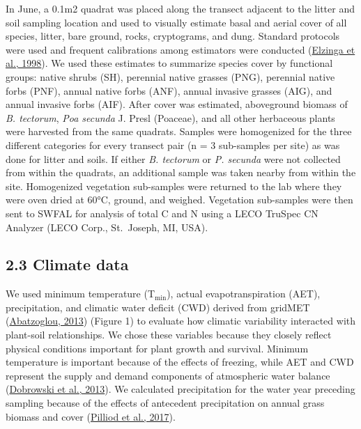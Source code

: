 \documentclass[
  11pt,
  a4paper,
]{article}
\begin{document}
In June, a 0.1m2 quadrat was placed along the transect adjacent to the litter and soil sampling location and used to visually estimate basal and aerial cover of all species, litter, bare ground, rocks, cryptograms, and dung. Standard protocols were used and frequent calibrations among estimators were conducted (\protect\hyperlink{ref-Elzinga1998}{Elzinga et al., 1998}). We used these estimates to summarize species cover by functional groups: native shrubs (SH), perennial native grasses (PNG), perennial native forbs (PNF), annual native forbs (ANF), annual invasive grasses (AIG), and annual invasive forbs (AIF). After cover was estimated, aboveground biomass of \emph{B. tectorum}, \emph{Poa secunda} J. Presl (Poaceae), and all other herbaceous plants were harvested from the same quadrats. Samples were homogenized for the three different categories for every transect pair (n = 3 sub-samples per site) as was done for litter and soils. If either \emph{B. tectorum} or \emph{P. secunda} were not collected from within the quadrats, an additional sample was taken nearby from within the site. Homogenized vegetation sub-samples were returned to the lab where they were oven dried at 60°C, ground, and weighed. Vegetation sub-samples were then sent to SWFAL for analysis of total C and N using a LECO TruSpec CN Analyzer (LECO Corp., St.~Joseph, MI, USA).

\hypertarget{climate-data}{%
\subsection{2.3 Climate data}\label{climate-data}}

We used minimum temperature (T\(_\text{min}\)), actual evapotranspiration (AET), precipitation, and climatic water deficit (CWD) derived from gridMET (\protect\hyperlink{ref-Abatzoglou2013}{Abatzoglou, 2013}) (Figure 1) to evaluate how climatic variability interacted with plant-soil relationships. We chose these variables because they closely reflect physical conditions important for plant growth and survival. Minimum temperature is important because of the effects of freezing, while AET and CWD represent the supply and demand components of atmospheric water balance (\protect\hyperlink{ref-Dobrowski2013}{Dobrowski et al., 2013}). We calculated precipitation for the water year preceding sampling because of the effects of antecedent precipitation on annual grass biomass and cover (\protect\hyperlink{ref-Pilliod2017}{Pilliod et al., 2017}).
\end{document}
